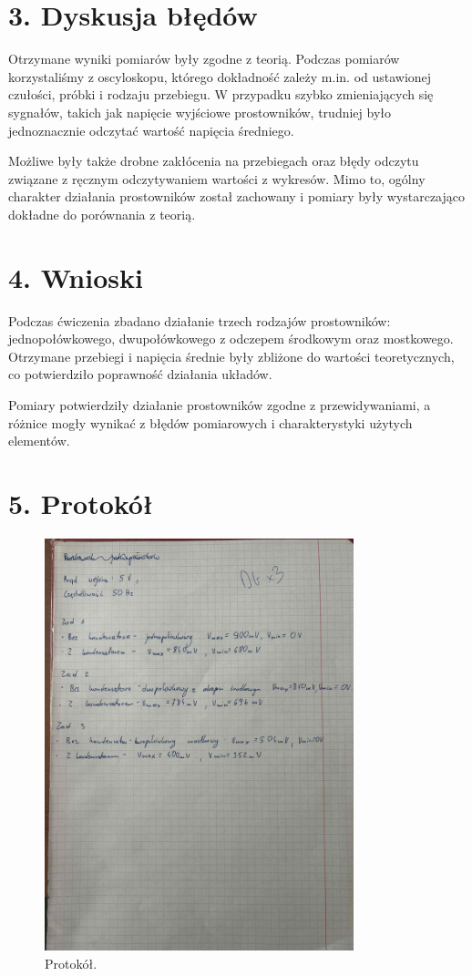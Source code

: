 \documentclass[a4paper,12pt]{article}
\begin{document}
\section*{3. Dyskusja błędów}

Otrzymane wyniki pomiarów były zgodne z teorią. Podczas pomiarów korzystaliśmy z oscyloskopu, którego dokładność zależy m.in. od ustawionej czułości, próbki i rodzaju przebiegu. W przypadku szybko zmieniających się sygnałów, takich jak napięcie wyjściowe prostowników, trudniej było jednoznacznie odczytać wartość napięcia średniego.

Możliwe były także drobne zakłócenia na przebiegach oraz błędy odczytu związane z ręcznym odczytywaniem wartości z wykresów. Mimo to, ogólny charakter działania prostowników został zachowany i pomiary były wystarczająco dokładne do porównania z teorią.

\section*{4. Wnioski}

Podczas ćwiczenia zbadano działanie trzech rodzajów prostowników: jednopołówkowego, dwupołówkowego z odczepem środkowym oraz mostkowego. Otrzymane przebiegi i napięcia średnie były zbliżone do wartości teoretycznych, co potwierdziło poprawność działania układów.

Pomiary potwierdziły działanie prostowników zgodne z przewidywaniami, a różnice mogły wynikać z błędów pomiarowych i charakterystyki użytych elementów.
\section*{5. Protokół}
\begin{figure}[H]
    \centering
    \includegraphics[width=0.8\textwidth]{11.jpg}
    \caption{Protokół.}
    \label{fig:schemat_dwu}
\end{figure}
\end{document}
